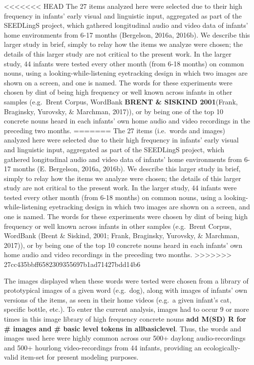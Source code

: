 \documentclass[10pt, letterpaper]{article}
\begin{document}
<<<<<<< HEAD
The 27 items analyzed here were selected due to their high frequency in
infants' early visual and linguistic input, aggregated as part of the
SEEDLingS project, which gathered longitudinal audio and video data of
infants' home environments from 6-17 months (Bergelson, 2016a, 2016b).
We describe this larger study in brief, simply to relay how the items we
analyze were chosen; the details of this larger study are not critical
to the present work. In the larger study, 44 infants were tested every
other month (from 6-18 months) on common nouns, using a
looking-while-listening eyetracking design in which two images are shown
on a screen, and one is named. The words for these experiments were
chosen by dint of being high frequency or well known across infants in
other samples (e.g.~Brent Corpus, WordBank \textbf{BRENT \& SISKIND
2001}(Frank, Braginsky, Yurovsky, \& Marchman, 2017)), or by being one
of the top 10 concrete nouns heard in each infants' own home audio and
video recordings in the preceding two months.
=======
The 27 items (i.e.~words and images) analyzed here were selected due to
their high frequency in infants' early visual and linguistic input,
aggregated as part of the SEEDLingS project, which gathered longitudinal
audio and video data of infants' home environments from 6-17 months (E.
Bergelson, 2016a, 2016b). We describe this larger study in brief, simply
to relay how the items we analyze were chosen; the details of this
larger study are not critical to the present work. In the larger study,
44 infants were tested every other month (from 6-18 months) on common
nouns, using a looking-while-listening eyetracking design in which two
images are shown on a screen, and one is named. The words for these
experiments were chosen by dint of being high frequency or well known
across infants in other samples (e.g.~Brent Corpus, WordBank (Brent \&
Siskind, 2001; Frank, Braginsky, Yurovsky, \& Marchman, 2017)), or by
being one of the top 10 concrete nouns heard in each infants' own home
audio and video recordings in the preceding two months.
>>>>>>> 27cc435bbff6582309355697b1ad71427bdd14b6

The images displayed when these words were tested were chosen from a
library of prototypical images of a given word (e.g.~dog), along with
images of infants' own versions of the items, as seen in their home
videos (e.g.~a given infant's cat, specific bottle, etc.). To enter the
current analysis, images had to occur 9 or more times in this image
library of high frequency concrete nouns \textbf{add M(SD) R for \#
images and \# basic level tokens in allbasiclevel}. Thus, the words and
images used here were highly common across our 500+ daylong
audio-recordings and 500+ hourlong video-recordings from 44 infants,
providing an ecologically-valid item-set for present modeling purposes.
\end{document}
